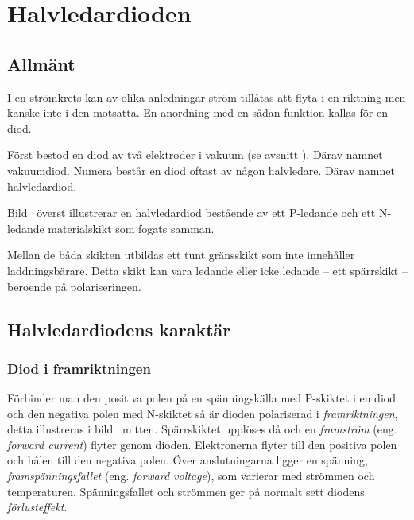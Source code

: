 \newpage
\section{Halvledardioden}

\subsection{Allmänt}
\label{dioden_allmänt}

I en strömkrets kan av olika anledningar ström tillåtas att flyta i en riktning
men kanske inte i den motsatta.
En anordning med en sådan funktion kallas för en diod.

Först bestod en diod av två elektroder i vakuum (se avsnitt
). Därav namnet vakuumdiod.
Numera består en diod oftast av någon halvledare. Därav namnet halvledardiod.


Bild~ överst illustrerar en halvledardiod bestående av ett
P-ledande och ett N-ledande materialskikt som fogats samman.

Mellan de båda skikten utbildas ett tunt gränsskikt som inte innehåller
laddningsbärare. Detta skikt kan vara ledande eller icke ledande -- ett
spärrskikt -- beroende på polariseringen.

\subsection{Halvledardiodens karaktär}

\subsubsection{Diod i framriktningen}

Förbinder man den positiva polen på en spänningskälla med P-skiktet i en diod
och den negativa polen med N-skiktet så är dioden polariserad i
\emph{framriktningen}, detta illustreras i bild~ mitten.
Spärrskiktet upplöses då och en \emph{framström}
(eng. \emph{forward current}) flyter genom dioden.
Elektronerna flyter till den positiva polen och hålen till den negativa polen.
Över anslutningarna ligger en spänning, \emph{framspänningsfallet}
(eng. \emph{forward voltage}), som varierar med strömmen och temperaturen.
Spänningsfallet och strömmen ger på normalt sett diodens \emph{förlusteffekt}.

